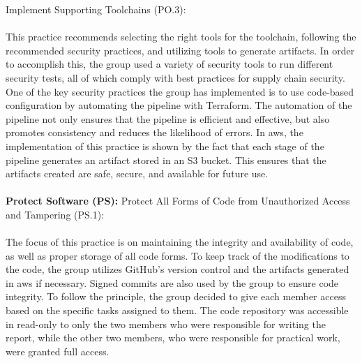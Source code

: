 Implement Supporting Toolchains (PO.3): \textit{}\cite{ssdf}
\\~\\
This practice recommends selecting the right tools for the toolchain, following the recommended security practices, and utilizing tools to generate artifacts. In order to accomplish this, the group used a variety of security tools to run different security tests, all of which comply with best practices for supply chain security. One of the key security practices the group has implemented is to use code-based configuration by automating the pipeline with Terraform. The automation of the pipeline not only ensures that the pipeline is efficient and effective, but also promotes consistency and reduces the likelihood of errors. In \acrshort{aws}, the implementation of this practice is shown by the fact that each stage of the pipeline generates an artifact stored in an S3 bucket. This ensures that the artifacts created are safe, secure, and available for future use.
\\~\\        
\textbf{Protect Software (PS):}
Protect All Forms of Code from Unauthorized
Access and Tampering (PS.1): \textit{}\cite{ssdf}
\\~\\
The focus of this practice is on maintaining the integrity and availability of code, as well as proper storage of all code forms. To keep track of the modifications to the code, the group utilizes GitHub's version control and the artifacts generated in \acrshort{aws} if necessary. Signed commits are also used by the group to ensure code integrity. To follow the  principle, the group decided to give each member access based on the specific tasks assigned to them. The code repository was accessible in read-only to only the two members who were responsible for writing the report, while the other two members, who were responsible for practical work, were granted full access. 

